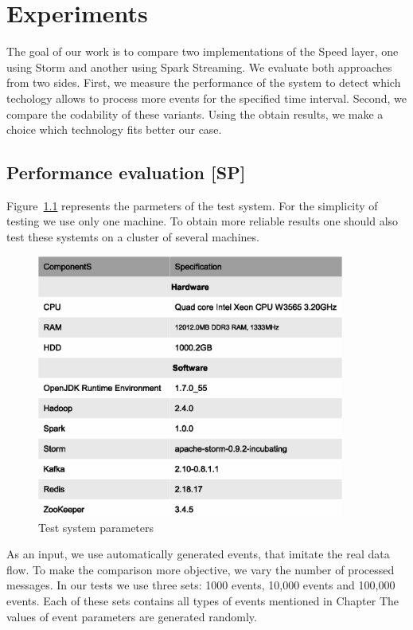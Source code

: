 \chapter{Experiments}
\label{chap:experiments}
The goal of our work is to compare two implementations of the Speed layer, one using Storm and another using Spark Streaming.
We evaluate both approaches from two sides.
First, we measure the performance of the system to detect which techology allows to process more events for the specified time interval.
Second, we compare the codability of these variants.
Using the obtain results, we make a choice which technology fits better our case.

\section{Performance evaluation [SP]}
Figure~\ref{fig:test_system_parameters} represents the parmeters of the test system.
For the simplicity of testing we use only one machine.
To obtain more reliable results one should also test these systemts on a cluster of several machines.

\begin{figure}[h]
  \centering
  \includegraphics [width=0.9\textwidth]{images/test_system_parameters}
  \caption{Test system parameters}
  \label{fig:test_system_parameters}
\end{figure}

As an input, we use automatically generated events, that imitate the real data flow.
To make the comparison more objective, we vary the number of processed messages.
In our tests we use three sets: 1000 events, 10,000 events and 100,000 events.
Each of these sets contains all types of events mentioned in Chapter %
The values of event parameters are generated randomly.

